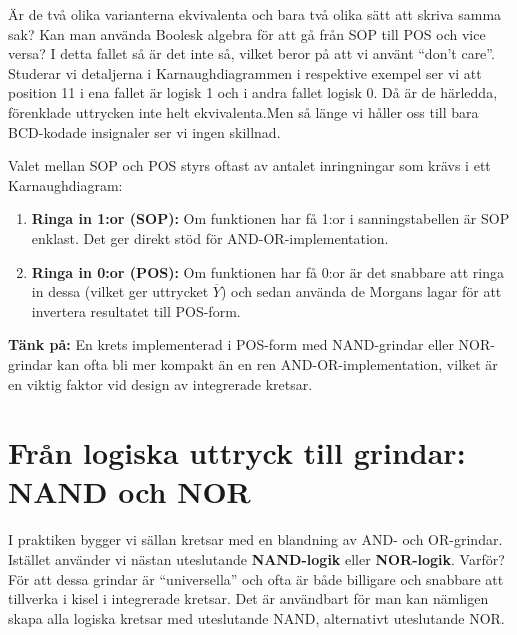 \documentclass[
  swedish,
  letterpaper,
  oneside,
  openany]{book}
\providecommand{\tightlist}{%
  \setlength{\itemsep}{0pt}\setlength{\parskip}{0pt}}
\begin{document}
Är de två olika varianterna ekvivalenta och bara två olika sätt att
skriva samma sak? Kan man använda Boolesk algebra för att gå från SOP
till POS och vice versa? I detta fallet så är det inte så, vilket beror
på att vi använt ``don't care''. Studerar vi detaljerna i
Karnaughdiagrammen i respektive exempel ser vi att position 11 i ena
fallet är logisk 1 och i andra fallet logisk 0. Då är de härledda,
förenklade uttrycken inte helt ekvivalenta.Men så länge vi håller oss
till bara BCD-kodade insignaler ser vi ingen skillnad.

\begin{tcolorbox}[enhanced jigsaw, arc=.35mm, bottomrule=.15mm, bottomtitle=1mm, breakable, colback=white, colbacktitle=quarto-callout-tip-color!10!white, colframe=quarto-callout-tip-color-frame, coltitle=black, left=2mm, leftrule=.75mm, opacityback=0, opacitybacktitle=0.6, rightrule=.15mm, title=\textcolor{quarto-callout-tip-color}{\faLightbulb}\hspace{0.5em}{Vilken metod ska man välja?}, titlerule=0mm, toprule=.15mm, toptitle=1mm]

Valet mellan SOP och POS styrs oftast av antalet inringningar som krävs
i ett Karnaughdiagram:

\begin{enumerate}
\def\labelenumi{\arabic{enumi}.}
\tightlist
\item
  \textbf{Ringa in 1:or (SOP):} Om funktionen har få 1:or i
  sanningstabellen är SOP enklast. Det ger direkt stöd för
  AND-OR-implementation.
\item
  \textbf{Ringa in 0:or (POS):} Om funktionen har få 0:or är det
  snabbare att ringa in dessa (vilket ger uttrycket \(\overline{Y}\))
  och sedan använda de Morgans lagar för att invertera resultatet till
  POS-form.
\end{enumerate}

\textbf{Tänk på:} En krets implementerad i POS-form med NAND-grindar
eller NOR-grindar kan ofta bli mer kompakt än en ren
AND-OR-implementation, vilket är en viktig faktor vid design av
integrerade kretsar.

\end{tcolorbox}

\section{Från logiska uttryck till grindar: NAND och
NOR}\label{fruxe5n-logiska-uttryck-till-grindar-nand-och-nor}

I praktiken bygger vi sällan kretsar med en blandning av AND- och
OR-grindar. Istället använder vi nästan uteslutande \textbf{NAND-logik}
eller \textbf{NOR-logik}. Varför? För att dessa grindar är
``universella'' och ofta är både billigare och snabbare att tillverka i
kisel i integrerade kretsar. Det är användbart för man kan nämligen
skapa alla logiska kretsar med uteslutande NAND, alternativt uteslutande
NOR.
\end{document}
